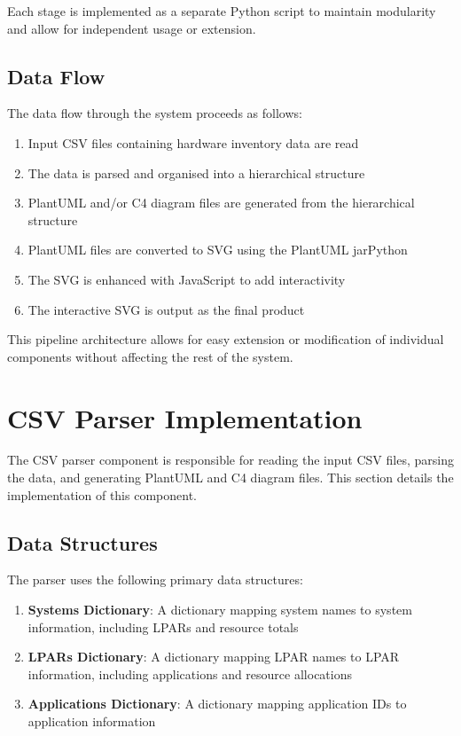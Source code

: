 \documentclass[a4paper,12pt]{article}
\begin{document}
Each stage is implemented as a separate Python script to maintain modularity and allow for independent usage or extension.

\subsection{Data Flow}

The data flow through the system proceeds as follows:

\begin{enumerate}
    \item Input CSV files containing hardware inventory data are read
    \item The data is parsed and organised into a hierarchical structure
    \item PlantUML and/or C4 diagram files are generated from the hierarchical structure
    \item PlantUML files are converted to SVG using the PlantUML jarPython 
    \item The SVG is enhanced with JavaScript to add interactivity
    \item The interactive SVG is output as the final product
\end{enumerate}

This pipeline architecture allows for easy extension or modification of individual components without affecting the rest of the system.

\section{CSV Parser Implementation}

The CSV parser component is responsible for reading the input CSV files, parsing the data, and generating PlantUML and C4 diagram files. This section details the implementation of this component.

\subsection{Data Structures}

The parser uses the following primary data structures:

\begin{enumerate}
    \item \textbf{Systems Dictionary}: A dictionary mapping system names to system information, including LPARs and resource totals
    \item \textbf{LPARs Dictionary}: A dictionary mapping LPAR names to LPAR information, including applications and resource allocations
    \item \textbf{Applications Dictionary}: A dictionary mapping application IDs to application information
\end{enumerate}
\end{document}
